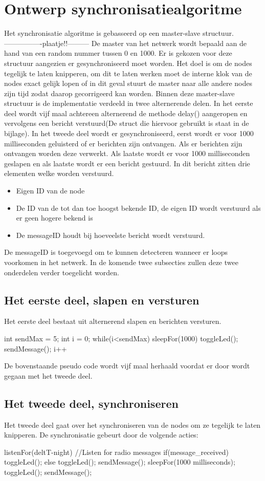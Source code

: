 \documentclass{article}
\begin{document}
\section{Ontwerp synchronisatiealgoritme}
Het synchronisatie algoritme is gebasseerd op een master-slave structuur.----------------plaatje!!--------- De master van het netwerk wordt bepaald aan de hand van een random nummer tussen 0 en 1000. Er is gekozen voor deze structuur aangezien er gesynchroniseerd moet worden. Het doel is om de nodes tegelijk te laten knipperen, om dit te laten werken moet de interne klok van de nodes exact gelijk lopen of in dit geval stuurt de master naar alle andere nodes zijn tijd zodat daarop gecorrigeerd kan worden. Binnen deze master-slave structuur is de implementatie verdeeld in twee alternerende delen.
In het eerste deel wordt vijf maal achtereen alternerend de methode delay() aangeropen en vervolgens een bericht verstuurd(De struct die hiervoor gebruikt is staat in de bijlage).
In het tweede deel wordt er gesynchroniseerd, eerst wordt er voor 1000 milliseconden geluisterd of er berichten zijn ontvangen. Als er berichten zijn ontvangen worden deze verwerkt. Als laatste wordt er voor 1000 milliseconden geslapen en als laatste wordt er een bericht gestuurd. 
In dit bericht zitten drie elementen welke worden verstuurd.
\begin{itemize}
	\item Eigen ID van de node
	\item De ID van de tot dan toe hoogst bekende ID, de eigen ID wordt verstuurd als er geen hogere bekend is
	\item De messageID houdt bij hoeveelste bericht wordt verstuurd.
\end{itemize}
De messageID is toegevoegd om te kunnen detecteren wanneer er loops voorkomen in het netwerk. 
In de komende twee subsecties zullen deze twee onderdelen verder toegelicht worden. 
\subsection{Het eerste deel, slapen en versturen}
Het eerste deel bestaat uit alternerend slapen en berichten versturen. 
\begin{verbatimtab}
int sendMax = 5;
int i = 0;
while(i<sendMax)
	sleepFor(1000)
	toggleLed();
	sendMessage();
	i++
\end{verbatimtab}
De bovenstaande pseudo code wordt vijf maal herhaald voordat er door wordt gegaan met het tweede deel.

\subsection{Het tweede deel, synchroniseren}
Het tweede deel gaat over het synchroniseren van de nodes om ze tegelijk te laten knipperen. De synchronisatie gebeurt door de volgende acties:
\begin{verbatimtab}
listenFor(deltT-night)       //Listen for radio messages
if(message_received){
	toggleLed();
} else {
	toggleLed(); 
	sendMessage();
}
sleepFor(1000 milliseconds);
toggleLed();
sendMessage();
\end{verbatimtab}
\end{document}
